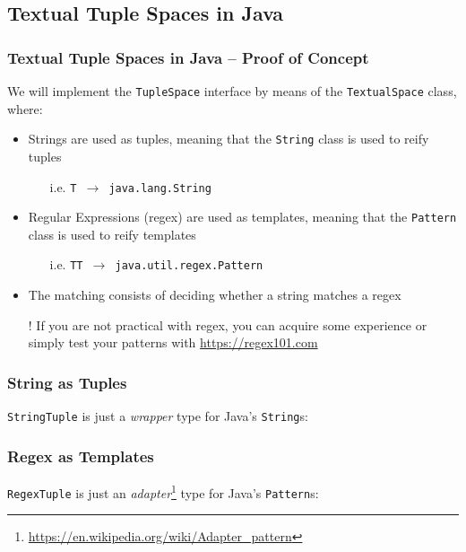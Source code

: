 \documentclass[presentation]{beamer}\mode<presentation>{\usetheme{AMSCesenaPurpleAndGold}}
\begin{document}
\subsection{Textual Tuple Spaces in Java}

\begin{frame}%
\frametitle{Textual Tuple Spaces in Java -- Proof of Concept}

	We will implement the \texttt{TupleSpace} interface by means of the \texttt{\alert{Textual}Space} class, where:
	\vfill
	\begin{itemize}	
		\item Strings are used as tuples, meaning that the \texttt{\alert{String}} class is used to reify tuples
	\begin{itemize}
		\item[i.e.] \texttt{T $\rightarrow$ java.lang.\alert{String}}
	\end{itemize}
	
	\vfill
	
	\item Regular Expressions (regex) are used as templates, meaning that the \texttt{\alert{Pattern}} class is used to reify templates
	\begin{itemize}
		\item[i.e.] \texttt{TT $\rightarrow$ java.util.regex.\alert{Pattern}}
		\end{itemize}
		
		\vfill
		
		\item The matching consists of \alert{deciding} whether a string matches a regex
		
		\vfill
		
		\item[!] If you are not practical with regex, you can acquire some experience or simply test your patterns with \url{https://regex101.com}
	\end{itemize}

\end{frame}

\begin{frame}
\frametitle{String as Tuples}

	\texttt{StringTuple} is just a \emph{wrapper} type for Java's \texttt{String}s:
	

\end{frame}

\begin{frame}
\frametitle{Regex as Templates}

	\texttt{RegexTuple} is just an \emph{adapter}\footnote{\url{https://en.wikipedia.org/wiki/Adapter_pattern}} type for Java's \texttt{Pattern}s:
	

\end{frame}
\end{document}
